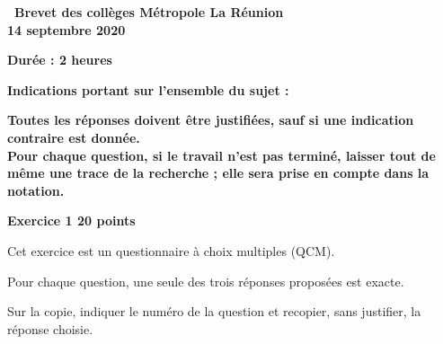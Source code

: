 \documentclass[10pt]{article}
\begin{document}
\setlength\parindent{0mm}
\pagestyle{fancy}
\thispagestyle{empty}
\begin{center}
    
{\Large \textbf{\decofourleft~Brevet des collèges Métropole La Réunion ~\decofourright}\\[5pt]\textbf{14 septembre  2020}}
    
\bigskip
    
\textbf{Durée : 2 heures} 

\medskip

\textbf{Indications portant sur l'ensemble du sujet :}
\end{center}

\textbf{Toutes les réponses doivent être justifiées, sauf si une indication contraire est
donnée.\\
Pour chaque question, si le travail n'est pas terminé, laisser tout de même une
trace de la recherche ; elle sera prise en compte dans la notation.}

\bigskip

\textbf{Exercice 1 \hfill 20 points}

\medskip

Cet exercice est un questionnaire à choix multiples (QCM).

Pour chaque question, une seule des trois réponses proposées est exacte.

Sur la copie, indiquer le numéro de la question et recopier, sans justifier, la réponse choisie.

\medskip
\end{document}

